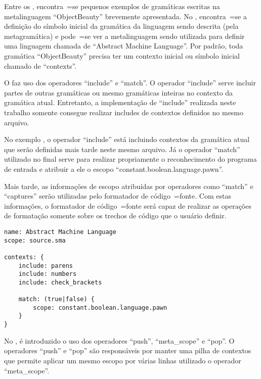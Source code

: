 Entre os ,
encontra~=se pequenos exemplos de gramáticas escritas na metalinguagem ``ObjectBeauty'' brevemente apresentada.
No ,
encontra~=se a definição do símbolo inicial da gramática da linguagem sendo descrita (pela metagramática) e
pode~=se ver a metalinguagem sendo utilizada para definir uma linguagem chamada de ``Abstract Machine Language''.
Por padrão,
toda gramática ``ObjectBeauty'' precisa ter um contexto inicial ou
símbolo inicial chamado de ``contexts''.

O  faz uso dos operadores ``include'' e
``match''.
O operador ``include'' serve incluir partes de outras gramáticas ou
mesmo gramáticas inteiras no contexto da gramática atual.
Entretanto,
a implementação de ``include'' realizada neste trabalho somente consegue realizar includes de contextos definidos no mesmo arquivo.

No exemplo ,
o operador ``include'' está incluindo contextos da gramática atual que serão definidas mais tarde neste mesmo arquivo.
Já o operador ``match'' utilizado no final serve para realizar propriamente o reconhecimento do programa de entrada e
atribuir a ele o escopo ``constant.boolean.language.pawn''.

Mais tarde,
as informações de escopo atribuídas por operadores como ``match'' e
``captures'' serão utilizadas pelo formatador de código~=fonte.
Com estas informações,
o formatador de código~=fonte será capaz de realizar as operações de formatação somente sobre os trechos de código que o usuário definir.
\begin{lstlisting}[caption={Exemplo de Gramática -- Símbolo Inicial},label={exemploDeGramaticaPawn1},style=yaml_style]
name: Abstract Machine Language
scope: source.sma

contexts: {
    include: parens
    include: numbers
    include: check_brackets

    match: (true|false) {
        scope: constant.boolean.language.pawn
    }
}
\end{lstlisting}

No ,
é introduzido o uso dos operadores ``push'',
``meta\_scope'' e
``pop''.
O operadores ``push'' e
``pop'' são responsáveis por manter uma pilha de contextos que permite aplicar um mesmo escopo por várias linhas utilizado o operador ``meta\_scope''.

